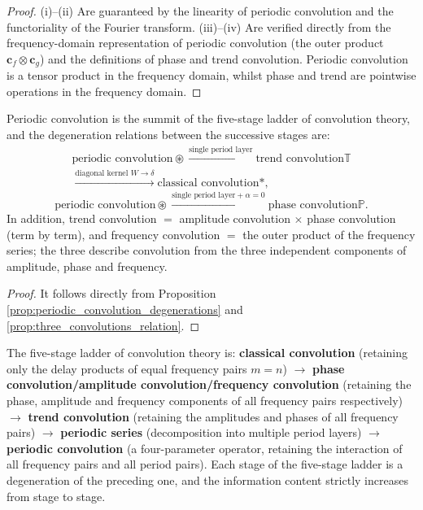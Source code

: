 \begin{proof}
(i)--(ii) Are guaranteed by the linearity of periodic convolution and the functoriality of the Fourier transform. (iii)--(iv) Are verified directly from the frequency-domain representation of periodic convolution (the outer product $\mathbf{c}_f \otimes \mathbf{c}_g$) and the definitions of phase and trend convolution. Periodic convolution is a tensor product in the frequency domain, whilst phase and trend are pointwise operations in the frequency domain.
\end{proof}

\begin{proposition}\label{prop:periodic_convolution_hierarchy}
Periodic convolution is the summit of the five-stage ladder of convolution theory, and the degeneration relations between the successive stages are:
\[
\begin{gathered}\text{periodic convolution} \circledast \xrightarrow{\text{single period layer}} \text{trend convolution} \mathbb{T}\\\xrightarrow{\text{diagonal kernel } W \to \delta} \text{classical convolution} *,\end{gathered}
\]
\[
\text{periodic convolution} \circledast \xrightarrow{\text{single period layer} + \alpha = 0} \text{phase convolution} \mathbb{P}.
\]
In addition, trend convolution $=$ amplitude convolution $\times$ phase convolution (term by term), and frequency convolution $=$ the outer product of the frequency series; the three describe convolution from the three independent components of amplitude, phase and frequency.
\end{proposition}

\begin{proof}
It follows directly from Proposition \ref{prop:periodic_convolution_degenerations} and \ref{prop:three_convolutions_relation}.
\end{proof}

\begin{remark}\label{rem:five_stage_hierarchy}
The five-stage ladder of convolution theory is: \textbf{classical convolution} (retaining only the delay products of equal frequency pairs $m = n$) $\to$ \textbf{phase convolution/amplitude convolution/frequency convolution} (retaining the phase, amplitude and frequency components of all frequency pairs respectively) $\to$ \textbf{trend convolution} (retaining the amplitudes and phases of all frequency pairs) $\to$ \textbf{periodic series} (decomposition into multiple period layers) $\to$ \textbf{periodic convolution} (a four-parameter operator, retaining the interaction of all frequency pairs and all period pairs). Each stage of the five-stage ladder is a degeneration of the preceding one, and the information content strictly increases from stage to stage.
\end{remark}

